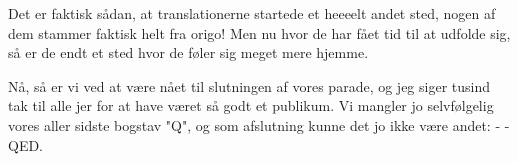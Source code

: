 \documentclass[a4paper,11pt]{article}
\begin{document}
\begin{sketch}

 Det er faktisk sådan, at translationerne startede et heeeelt andet sted, nogen af dem stammer faktisk helt fra origo! Men nu hvor de har fået tid til at udfolde sig, så er de endt et sted hvor de føler sig meget mere hjemme.


 Nå, så er vi ved at være nået til slutningen af vores parade, og jeg siger tusind tak til alle jer for at have været så godt et publikum. Vi mangler jo selvfølgelig vores aller sidste bogstav "Q", og som afslutning kunne det jo ikke være andet: -  - QED.


\end{sketch}
\end{document}
